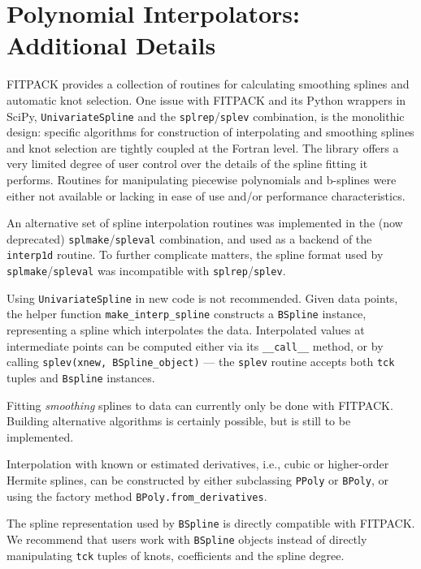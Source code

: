 \documentclass[fleqn,10pt]{wlscirep}
\newcommand{\code}[1]{\texttt{#1}}
\begin{document}
\section{Polynomial Interpolators: Additional Details}
FITPACK provides a collection of routines for calculating
smoothing splines and automatic knot selection. One issue 
with FITPACK and its Python wrappers in SciPy, \code{UnivariateSpline}
and the \code{splrep}/\code{splev} combination, is the monolithic design:
specific algorithms for construction of interpolating and 
smoothing splines and knot selection are tightly coupled 
at the Fortran level. The library offers a very
limited degree of user control over the details 
of the spline fitting it performs. 
%
Routines for manipulating piecewise polynomials and b-splines were either
not available or lacking in ease of use and/or performance characteristics.

An alternative set of spline interpolation routines was implemented in the
(now deprecated) \code{splmake}/\code{spleval} combination, and used as a
backend of the \code{interp1d} routine. To further complicate matters,
the spline format used by \code{splmake}/\code{spleval} was incompatible 
with \code{splrep}/\code{splev}.

Using \code{UnivariateSpline} in new code is not recommended. Given data points,
the helper function \code{make\_interp\_spline} constructs a \code{BSpline}
instance, representing a spline which interpolates the data. Interpolated values
at intermediate points can be computed either via its \code{\_\_call\_\_} method,
or by calling \code{splev(xnew, BSpline\_object)} --- the \code{splev} routine
accepts both \code{tck} tuples and \code{Bspline} instances.

Fitting \emph{smoothing} splines to data can currently only be done with 
FITPACK. Building alternative algorithms is certainly possible,
but is still to be implemented.

Interpolation with known or estimated derivatives, i.e., cubic or
higher-order Hermite splines, can be constructed by either
subclassing \code{PPoly} or \code{BPoly}, or using the factory
method \code{BPoly.from\_derivatives}.

The spline representation used by \code{BSpline} is directly
compatible with FITPACK. We recommend that users work with
\code{BSpline} objects instead of directly manipulating \code{tck}
tuples of knots, coefficients and the spline degree.
\end{document}
